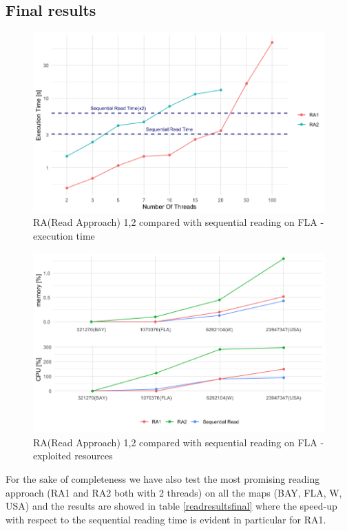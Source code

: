 \documentclass[twocolumn, switch]{article} %
\begin{document}
\subsection{Final results}
\begin{figure}[ht!]
  \centering
  \includegraphics[width=1\linewidth]{read/par_read_all_time.png}
  \caption{RA(Read Approach) 1,2 compared with sequential reading on FLA - execution time}
  \label{parreadalltime}
\end{figure}
\begin{figure}[ht!]
  \centering
  \includegraphics[width=1\linewidth]{read/parread_cpumem.png}
  \caption{RA(Read Approach) 1,2 compared with sequential reading on FLA - exploited resources}
  \label{parreadallcpumem}
\end{figure}
For the sake of completeness we have also test the most promising reading approach (RA1 and RA2 both with
2 threads) on all the maps (BAY, FLA, W, USA) and the results are showed in table \ref{readresultsfinal}
where the speed-up with respect to the sequential reading time is evident in particular for RA1.
\end{document}
